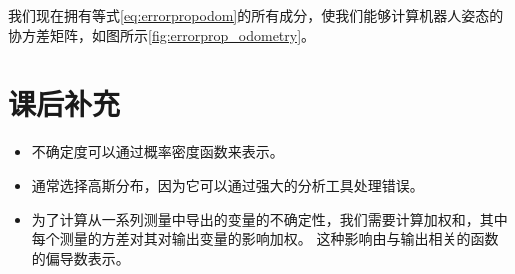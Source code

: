 我们现在拥有等式\ref{eq:errorpropodom}的所有成分，使我们能够计算机器人姿态的协方差矩阵，如图所示\ref{fig:errorprop_odometry}。


\section{课后补充}

\begin{itemize}

\item 不确定度可以通过概率密度函数来表示。
\item 通常选择高斯分布，因为它可以通过强大的分析工具处理错误。
\item 为了计算从一系列测量中导出的变量的不确定性，我们需要计算加权和，其中每个测量的方差对其对输出变量的影响加权。 这种影响由与输出相关的函数的偏导数表示。
\end{itemize}


